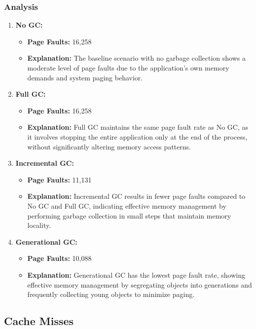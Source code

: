 \documentclass[10pt]{article}
\begin{document}
\subsubsection{Analysis}
\begin{enumerate}
  \item \textbf{No GC:} 
  \begin{itemize}
    \item \textbf{Page Faults:} 16,258
    \item \textbf{Explanation:} The baseline scenario with no garbage collection shows a moderate level of page faults due to the application's own memory demands and system paging behavior.
  \end{itemize}

  \item \textbf{Full GC:} 
  \begin{itemize}
    \item \textbf{Page Faults:} 16,258
    \item \textbf{Explanation:} Full GC maintains the same page fault rate as No GC, as it involves stopping the entire application only at the end of the process, without significantly altering memory access patterns.
  \end{itemize}

  \item \textbf{Incremental GC:} 
  \begin{itemize}
    \item \textbf{Page Faults:} 11,131
    \item \textbf{Explanation:} Incremental GC results in fewer page faults compared to No GC and Full GC, indicating effective memory management by performing garbage collection in small steps that maintain memory locality.
  \end{itemize}

  \item \textbf{Generational GC:} 
  \begin{itemize}
    \item \textbf{Page Faults:} 10,088
    \item \textbf{Explanation:} Generational GC has the lowest page fault rate, showing effective memory management by segregating objects into generations and frequently collecting young objects to minimize paging.
  \end{itemize}
\end{enumerate}

\subsection{Cache Misses}
\end{document}
